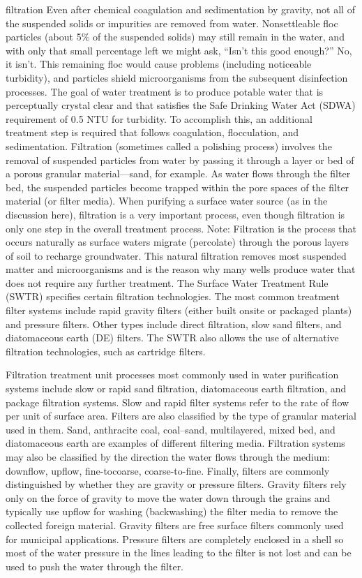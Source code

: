 \documentclass{article}
\begin{document}
filtration Even after chemical coagulation and sedimentation by gravity,
not all of the suspended solids or impurities are removed from water.
Nonsettleable floc particles (about 5\% of the suspended solids) may
still remain in the water, and with only that small percentage left we
might ask, ``Isn't this good enough?'' No, it isn't. This remaining floc
would cause problems (including noticeable turbidity), and particles
shield microorganisms from the subsequent disinfection processes. The
goal of water treatment is to produce potable water that is perceptually
crystal clear and that satisfies the Safe Drinking Water Act (SDWA)
requirement of 0.5 NTU for turbidity. To accomplish this, an additional
treatment step is required that follows coagulation, flocculation, and
sedimentation. Filtration (sometimes called a polishing process)
involves the removal of suspended particles from water by passing it
through a layer or bed of a porous granular material---sand, for
example. As water flows through the filter bed, the suspended particles
become trapped within the pore spaces of the filter material (or filter
media). When purifying a surface water source (as in the discussion
here), filtration is a very important process, even though filtration is
only one step in the overall treatment process. Note: Filtration is the
process that occurs naturally as surface waters migrate (percolate)
through the porous layers of soil to recharge groundwater. This natural
filtration removes most suspended matter and microorganisms and is the
reason why many wells produce water that does not require any further
treatment. The Surface Water Treatment Rule (SWTR) specifies certain
filtration technologies. The most common treatment filter systems
include rapid gravity filters (either built onsite or packaged plants)
and pressure filters. Other types include direct filtration, slow sand
filters, and diatomaceous earth (DE) filters. The SWTR also allows the
use of alternative filtration technologies, such as cartridge filters.

Filtration treatment unit processes most commonly used in water
purification systems include slow or rapid sand filtration, diatomaceous
earth filtration, and package filtration systems. Slow and rapid filter
systems refer to the rate of flow per unit of surface area. Filters are
also classified by the type of granular material used in them. Sand,
anthracite coal, coal--sand, multilayered, mixed bed, and diatomaceous
earth are examples of different filtering media. Filtration systems may
also be classified by the direction the water flows through the medium:
downflow, upflow, fine-tocoarse, coarse-to-fine. Finally, filters are
commonly distinguished by whether they are gravity or pressure filters.
Gravity filters rely only on the force of gravity to move the water down
through the grains and typically use upflow for washing (backwashing)
the filter media to remove the collected foreign material. Gravity
filters are free surface filters commonly used for municipal
applications. Pressure filters are completely enclosed in a shell so
most of the water pressure in the lines leading to the filter is not
lost and can be used to push the water through the filter.
\end{document}

